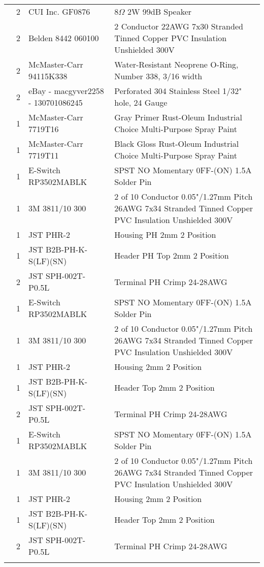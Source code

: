 \begin{longtabu}{X[3,c,m] X[1,c,m] X[3,c,m] X[5,l,m]}
   & 2 & CUI Inc. GF0876 & 8$\Omega$ 2W 99dB Speaker \\
  & 2 & Belden 8442 060100 & 2 Conductor 22AWG 7x30 Stranded Tinned Copper PVC Insulation Unshielded 300V \\
  & 2 & McMaster-Carr 94115K338 & Water-Resistant Neoprene O-Ring, Number 338, 3/16 width \\
  & 2 & eBay - macgyver2258 - 130701086245 & Perforated 304 Stainless Steel 1/32" hole, 24 Gauge \\
  & 1 & McMaster-Carr 7719T16 & Gray Primer Rust-Oleum Industrial Choice Multi-Purpose Spray Paint \\
  & 1 & McMaster-Carr 7719T11 & Black Gloss Rust-Oleum Industrial Choice Multi-Purpose Spray Paint \\ \mrule

   & 1 & E-Switch RP3502MABLK & SPST NO Momentary 0FF-(ON) 1.5A Solder Pin \\
  & 1 & 3M 3811/10 300 & 2 of 10 Conductor 0.05"/1.27mm Pitch 26AWG 7x34 Stranded Tinned Copper PVC Insulation Unshielded 300V \\
  & 1 & JST PHR-2 & Housing PH 2mm 2 Position \\
  & 1 & JST B2B-PH-K-S(LF)(SN) & Header PH Top 2mm 2 Position \\
  & 2 & JST SPH-002T-P0.5L & Terminal PH Crimp 24-28AWG \\ \mrule

   & 1 & E-Switch RP3502MABLK & SPST NO Momentary 0FF-(ON) 1.5A Solder Pin \\
  & 1 & 3M 3811/10 300 & 2 of 10 Conductor 0.05"/1.27mm Pitch 26AWG 7x34 Stranded Tinned Copper PVC Insulation Unshielded 300V \\
  & 1 & JST PHR-2 & Housing 2mm 2 Position \\
  & 1 & JST B2B-PH-K-S(LF)(SN) & Header Top 2mm 2 Position \\
  & 2 & JST SPH-002T-P0.5L & Terminal PH Crimp 24-28AWG \\ \mrule

   & 1 & E-Switch RP3502MABLK & SPST NO Momentary 0FF-(ON) 1.5A Solder Pin \\
  & 1 & 3M 3811/10 300 & 2 of 10 Conductor 0.05"/1.27mm Pitch 26AWG 7x34 Stranded Tinned Copper PVC Insulation Unshielded 300V \\
  & 1 & JST PHR-2 & Housing 2mm 2 Position \\
  & 1 & JST B2B-PH-K-S(LF)(SN) & Header Top 2mm 2 Position \\
  & 2 & JST SPH-002T-P0.5L & Terminal PH Crimp 24-28AWG \\ \mrule


\end{longtabu}
